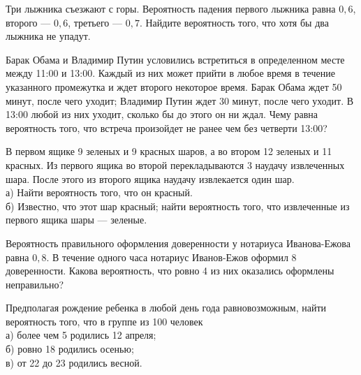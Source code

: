 \newpage\setcounter{zad}{0}



\begin{zkrW}{20}\noindent 
	Три лыжника съезжают с горы. Вероятность падения первого лыжника равна $0{,}6$, второго --- $0{,}6$, третьего --- $0{,}7$. Найдите вероятность того, что хотя бы два лыжника не упадут.
 
\end{zkrW}

\begin{zkrW}{20}\noindent 
	Барак Обама и Владимир Путин условились встретиться в определенном месте между 11:00 и 13:00. Каждый из них может прийти в любое время в течение указанного промежутка и ждет второго некоторое время. Барак Обама ждет 50 минут, после чего уходит; Владимир Путин ждет 30 минут, после чего уходит. В 13:00 любой из них уходит, сколько бы до этого он ни ждал. Чему равна вероятность того, что встреча произойдет не ранее чем без четверти 13:00?
 
\end{zkrW}

\begin{zkrW}{20}\noindent 
	В первом ящике 9 зеленых и 9 красных шаров, а во втором 12 зеленых и 11 красных. Из первого ящика во второй перекладываются 3 наудачу извлеченных шара. После этого из второго ящика наудачу извлекается один шар. \\ \indent а) Найти вероятность того, что он красный. \\ \indent б) Известно, что этот шар красный; найти вероятность того, что извлеченные из первого ящика шары --- зеленые.
 
\end{zkrW}

\begin{zkrW}{20}\noindent 
	Вероятность правильного оформления доверенности у нотариуса Иванова-Ежова равна $0{,}8$. В течение одного часа нотариус Иванов-Ежов оформил 8 доверенности. Какова вероятность, что ровно 4 из них оказались оформлены неправильно?
 
\end{zkrW}

\begin{zkrW}{20}\noindent 
	Предполагая рождение ребенка в любой день года равновозможным, найти вероятность того, что в группе из 100 человек \\ \indent а) более чем 5 родились 12 апреля; \\ \indent б) ровно 18 родились осенью; \\ \indent в) от 22 до 23 родились весной.
 
\end{zkrW}

